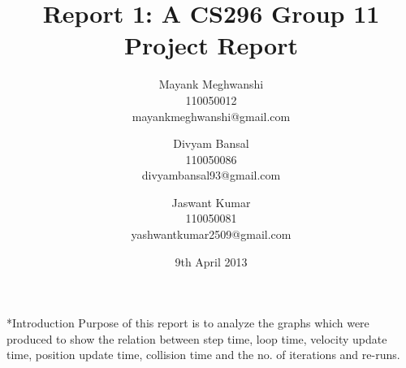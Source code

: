 \documentclass[11pt]{article}
\begin{document}
\title{Report 1: A CS296 Group 11 Project Report}
\author{Mayank Meghwanshi\\110050012 \\mayankmeghwanshi@gmail.com 
	\and Divyam Bansal \\ 110050086\\divyambansal93@gmail.com
	\and Jaswant Kumar \\ 110050081 \\yashwantkumar2509@gmail.com
}
\date{9th April 2013}
\maketitle

\begin{section}*{Introduction}
Purpose of this report is to analyze the graphs which were produced to show the relation between step time, loop time, velocity update time, position update time, collision time and the no. of iterations and re-runs.

\end{section}
\end{document}
